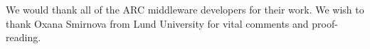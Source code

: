 \documentclass[twocolumn]{svjour3}         %
\begin{document}
%


\begin{acknowledgements}
We would thank all of the ARC middleware developers for their work. We wish to thank Oxana Smirnova from Lund University for vital comments and proof-reading.
\end{acknowledgements}

\end{document}
